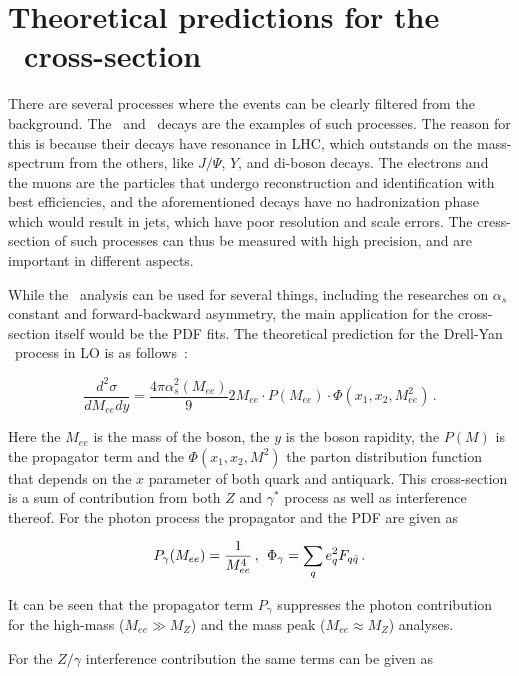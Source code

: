 \section{Theoretical predictions for the \Zee\ cross-section}

There are several processes where the events can be clearly filtered from the background. The \Wenu\ and \Zee\ decays are the examples of such processes. The reason for this is because their decays have resonance in LHC, which outstands on the mass-spectrum from the others, like $J/\Psi$, $Y$, and di-boson decays. The electrons and the muons are the particles that undergo reconstruction and identification with best efficiencies, and the aforementioned decays have no hadronization phase which would result in jets, which have poor resolution and scale errors. The cress-section of such processes can thus be measured with high precision, and are important in different aspects.

While the \Zee\ analysis can be used for several things, including the researches on $\alpha_{s}$ constant and forward-backward asymmetry, the main application for the cross-section itself would be the PDF fits. The theoretical prediction for the Drell-Yan \Zgee\ process in LO is as follows~\cite{lib:theory_Z-c-s}:

\begin{equation}
\frac{d^{2}\sigma}{dM_{ee}dy} = \frac{4\pi\alpha^{2}_{s}(M_{ee})}{9}2M_{ee}\cdot P(M_{ee})\cdot\Phi(x_{1},x_{2},M^{2}_{ee})\,.
\end{equation}

Here the $M_{ee}$ is the mass of the boson, the $y$ is the boson rapidity, the $P(M)$ is the propagator term and the $\Phi(x_{1},x_{2},M^{2})$ the parton distribution function that depends on the $x$ parameter of both quark and antiquark. This cross-section is a sum of contribution from both $Z$ and $\gamma^*$ process as well as interference thereof. For the photon process the propagator and the PDF are given as

\begin{equation}
P_{\gamma}(M_{ee}) = \frac{1}{M^{4}_{ee}}\,,\,\;\Phi_{\gamma} = \sum_{q} e^{2}_{q} F_{q\bar{q}} \,.
\end{equation}

It can be seen that the propagator term $P_{\gamma}$ suppresses the photon contribution for the high-mass ($M_{ee} \gg M_{Z}$) and the mass peak ($M_{ee} \approx M_{Z}$) analyses.

For the $Z/\gamma$ interference contribution the same terms can be given as

